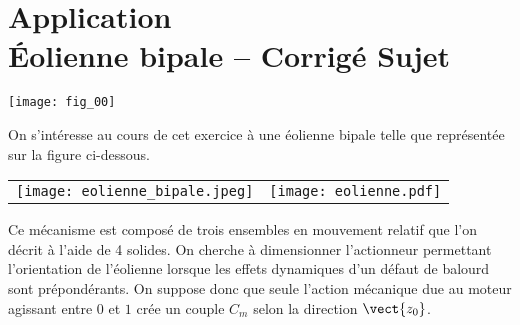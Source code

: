 \chapter*{Application  \\ 
Éolienne bipale -- \ifprof Corrigé \else Sujet \fi}

\iflivret {} \else
\ifprof  {} \else \fi
\fi

\setcounter{question}{0}
\begin{marginfigure}
\texttt{[image: fig\_00]}
\end{marginfigure}



\ifprof
\else
On s'intéresse au cours de cet exercice à une éolienne bipale telle que représentée sur la figure ci-dessous. 
\begin{center}
\begin{tabular}{cc}
\texttt{[image: eolienne\_bipale.jpeg]}
&
\texttt{[image: eolienne.pdf]}
\end{tabular}
\end{center}

Ce mécanisme est composé de trois ensembles en mouvement relatif que l'on décrit à l'aide de 4 solides.%
On cherche à dimensionner l'actionneur permettant l'orientation de l'éolienne lorsque les effets dynamiques d'un défaut de balourd sont prépondérants. 
%
On suppose donc que seule l'action mécanique due au moteur agissant entre $0$ et $1$  crée un couple $C_m$ selon la direction $\vect{z_0}$. 

